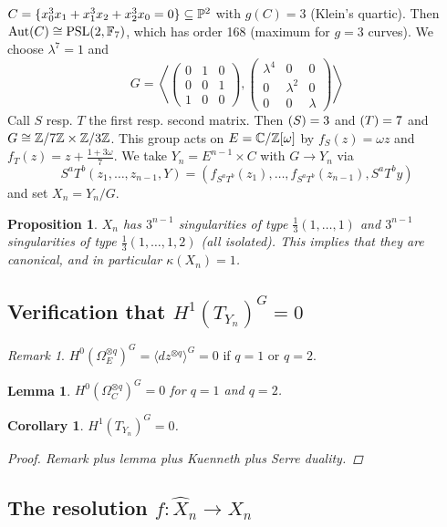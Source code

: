 \documentclass[A4paper, british]{amsart}
\theoremstyle{darkgreentheorem}
\newtheorem{lm}[thm]{Lemma}
\newtheorem{prop}[thm]{Proposition}
\newtheorem{cor}[thm]{Corollary}
\theoremstyle{darkbluedefinition}
\theoremstyle{darkredexample}
\theoremstyle{remark}
\newtheorem{rem}[thm]{Remark}
\DeclareMathOperator{\ord}{ord}
\DeclareMathOperator{\Aut}{Aut}
\let\ord\relax
\DeclareMathOperator{\ord}{ord}
\newcommand{\1}{\mathbbm{1}}
\newcommand{\ot}{\otimes}
\newcommand{\tms}{\times}
\newcommand{\sub}{\subseteq}
\begin{document}
$C=\{x_{0}^{3}x_{1}+x_{1}^{3}x_{2}+x_{2}^{3}x_{0}=0\}\sub \P^{2}$ with $g(C)=3$ (Klein's quartic).
Then $\Aut(C)\cong \operatorname{PSL}(2,\bbF_{7})$, which has order 168 (maximum for $g=3$ curves).
We choose $\lambda^{7}=1$ and
\[ G=\left\langle \begin{pmatrix} 0 & 1 & 0 \\ 0 & 0 & 1 \\ 1 & 0 & 0 \end{pmatrix},
    \begin{pmatrix} \lambda^{4} & 0 & 0 \\ 0 & \lambda^{2} & 0 \\ 0 & 0 & \lambda \end{pmatrix}\right\rangle \]
Call $S$ resp. $T$ the first resp. second matrix.
Then $\ord(S)=3$ and $\ord(T)=7$ and $G\cong \Z/7\Z\tms \Z/3\Z$.
This group acts on $E=\mathbb{C}/\mathbb{Z}[\omega]$ by $f_{S}(z)=\omega z$ and $f_{T}(z)=z+\frac{1+3\omega}{7}$.
We take $Y_{n}=E^{n-1}\tms C$ with $G\to Y_{n}$ via
\[ S^{a}T^{b}(z_{1},\ldots,z_{n-1},Y)=(f_{S^{a}T^{b}}(z_{1}),\ldots, f_{S^{a}T^{b}}(z_{n-1}),S^{a}T^{b}y) \]
and set $X_{n}=Y_{n}/G$.

\begin{prop}
    $X_{n}$ has $3^{n-1}$ singularities of type $\frac{1}{3}(1,\ldots,1)$ and $3^{n-1}$ singularities of type $\frac{1}{3}(1,\ldots,1,2)$ (all isolated).
    This implies that they are canonical, and in particular $\kappa(X_{n})=1$.
\end{prop}

\subsection{Verification that $H^{1}(T_{Y_{n}})^{G}=0$}

\begin{rem}
    $H^{0}(\Omega_{E}^{\ot q})^{G}=\langle dz^{\ot q} \rangle^{G}=0$ if $q=1$ or $q=2$.
\end{rem}

\begin{lm}
    $H^{0}(\Omega_{C}^{\ot q})^{G}=0$ for $q=1$ and $q=2$.
\end{lm}

\begin{cor}
    $H^{1}(T_{Y_{n}})^{G}=0$.
    \begin{proof}
	Remark plus lemma plus Kuenneth plus Serre duality.
    \end{proof}
\end{cor}

\subsection{The resolution $f\colon \hat{X}_{n}\to X_{n}$}
\end{document}
